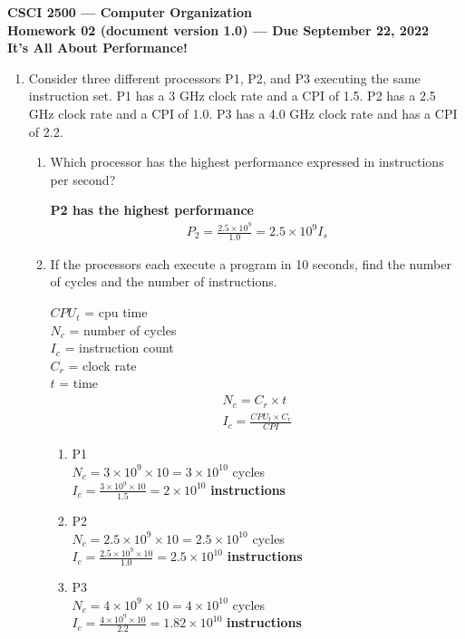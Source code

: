 \documentclass[10pt]{article}
\begin{document}
\begin{center}
    \textbf{CSCI 2500 — Computer Organization\\
    Homework 02 (document version 1.0) — Due September 22, 2022\\
    It’s All About Performance!\\}
\end{center}

\begin{enumerate}
    \item Consider three different processors P1, P2, and P3 executing the same instruction set. P1 has a 3 GHz clock rate and a CPI of 1.5. P2 has a 2.5 GHz clock rate and a CPI of 1.0. P3 has a 4.0 GHz clock rate and has a CPI of 2.2.
    
    \begin{enumerate}
        \item Which processor has the highest performance expressed in instructions per second?
        \begin{center}
            \textbf{P2 has the highest performance}
            \begin{align*}
                P_2 = \frac{2.5 \times 10^9}{1.0} = 2.5 \times 10^9I_s
            \end{align*}

        \end{center}
        
        \item If the processors each execute a program in 10 seconds, find the number of cycles and the number of instructions.
        \begin{center}
            $CPU_t$ = cpu time\\$N_c$ = number of cycles\\$I_c$ = instruction count\\$C_r$ = clock rate\\$t$ = time
            \begin{align*}
                N_c = C_r \times t\\
                I_c = \frac{CPU_t \times C_r}{CPI}
            \end{align*}
        \end{center}
        \begin{enumerate}
            \item P1 \\$N_c = 3 \times 10^9 \times 10 = 3\times10^{10}$ cycles\\$I_c = \frac{3\times10^9\times10}{1.5} = 2\times10^{10}$ \textbf{instructions}
            \item P2 \\$N_c = 2.5 \times 10^9 \times 10 = 2.5 \times 10^{10}$ cycles\\$I_c = \frac{2.5\times10^9\times10}{1.0} = 2.5\times10^{10}$ \textbf{instructions}
            \item P3 \\$N_c = 4 \times 10^9 \times 10 = 4\times10^{10}$ cycles \\ $I_c = \frac{4\times10^9\times10}{2.2} = 1.82\times10^{10}$ \textbf{instructions}
        \end{enumerate}
        


\end{enumerate}
\end{enumerate}
\end{document}
